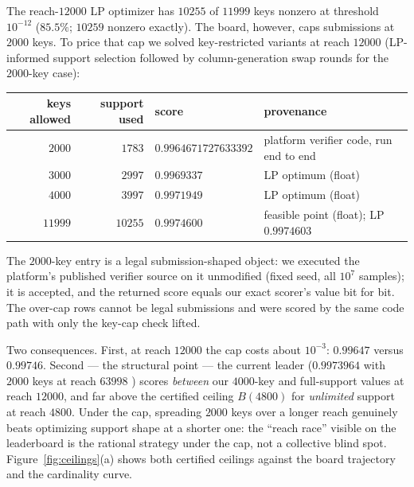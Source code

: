 \documentclass[11pt]{article}
\theoremstyle{remark}
\begin{document}
The reach-$12000$ LP optimizer has $10255$ of $11999$ keys nonzero at
threshold $10^{-12}$ ($85.5\%$; $10259$ nonzero exactly). The board,
however, caps submissions at $2000$ keys. To price that cap we solved
key-restricted variants at reach $12000$ (LP-informed support selection
followed by column-generation swap rounds for the $2000$-key case):

\begin{center}
\begin{tabular}{@{}rrll@{}}
\toprule
keys allowed & support used & score & provenance \\
\midrule
$2000$  & $1783$  & $0.9964671727633392$ & platform verifier code, run
end to end \\
$3000$  & $2997$  & $0.9969337$ & LP optimum (float) \\
$4000$  & $3997$  & $0.9971949$ & LP optimum (float) \\
$11999$ & $10255$ & $0.9974600$ & feasible point (float); LP
$0.9974603$ \\
\bottomrule
\end{tabular}
\end{center}

\noindent
The $2000$-key entry is a legal submission-shaped object: we executed the
platform's published verifier source on it unmodified (fixed seed, all
$10^7$ samples); it is accepted, and the returned score equals our exact
scorer's value bit for bit. The over-cap rows cannot be legal submissions
and were scored by the same code path with only the key-cap check lifted.

Two consequences. First, at reach $12000$ the cap costs about $10^{-3}$:
$0.99647$ versus $0.99746$. Second --- the structural point --- the
current leader ($0.9973964$ with $2000$ keys at reach $63998$
\cite{JSAgent26}) scores \emph{between} our $4000$-key and full-support
values at reach $12000$, and far above the certified ceiling
$B(4800)$ for \emph{unlimited} support at reach $4800$. Under the cap,
spreading $2000$ keys over a longer reach genuinely beats optimizing
support shape at a shorter one: the ``reach race'' visible on the
leaderboard is the rational strategy under the cap, not a collective blind
spot. Figure~\ref{fig:ceilings}(a) shows both certified ceilings against
the board trajectory and the cardinality curve.
\end{document}
